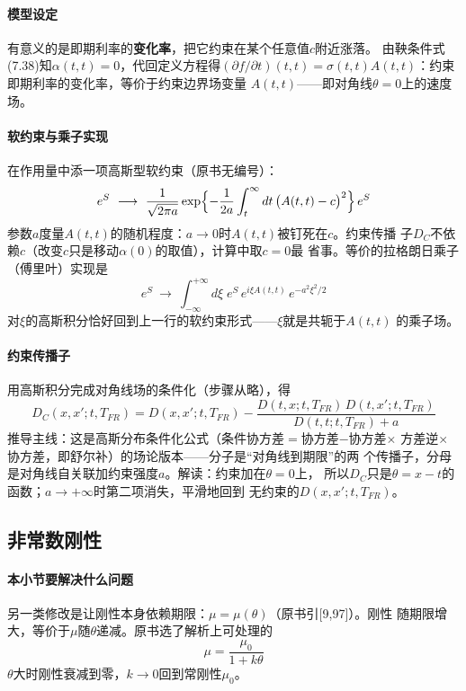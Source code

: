 \paragraph{模型设定}
有意义的是即期利率的\textbf{变化率}，把它约束在某个任意值$c$附近涨落。
由鞅条件式(7.38)知$\alpha(t,t)=0$，代回定义方程得$(\partial f/\partial t)
(t,t)=\sigma(t,t)A(t,t)$：约束即期利率的变化率，等价于约束边界场变量
$A(t,t)$——即对角线$\theta=0$上的速度场。

\paragraph{软约束与乘子实现}
在作用量中添一项高斯型软约束（原书无编号）：
\begin{equation*}
e^{S}\ \longrightarrow\ \frac{1}{\sqrt{2\pi a}}
\exp\Bigl\{-\frac{1}{2a}\int_{t}^{\infty}dt\,\bigl(A(t,t)-c\bigr)^{2}
\Bigr\}\,e^{S}
\end{equation*}
参数$a$度量$A(t,t)$的随机程度：$a\to0$时$A(t,t)$被钉死在$c$。约束传播
子$D_{C}$不依赖$c$（改变$c$只是移动$\alpha(0)$的取值），计算中取$c=0$最
省事。等价的拉格朗日乘子（傅里叶）实现是
\begin{equation*}
e^{S}\ \longrightarrow\ \int_{-\infty}^{+\infty}d\xi\;
e^{S}\,e^{i\xi A(t,t)}\,e^{-a^{2}\xi^{2}/2}
\tag{7.67}
\end{equation*}
对$\xi$的高斯积分恰好回到上一行的软约束形式——$\xi$就是共轭于$A(t,t)$
的乘子场。

\paragraph{约束传播子}
用高斯积分完成对角线场的条件化（步骤从略），得
\begin{equation*}
D_{C}(x,x';t,T_{FR})=D(x,x';t,T_{FR})-
\frac{D(t,x;t,T_{FR})\,D(t,x';t,T_{FR})}{D(t,t;t,T_{FR})+a}
\tag{7.68}
\end{equation*}
推导主线：这是高斯分布条件化公式（条件协方差$=$协方差$-$协方差$\times$
方差逆$\times$协方差，即舒尔补）的场论版本——分子是“对角线到期限”的两
个传播子，分母是对角线自关联加约束强度$a$。解读：约束加在$\theta=0$上，
所以$D_{C}$只是$\theta=x-t$的函数；$a\to+\infty$时第二项消失，平滑地回到
无约束的$D(x,x';t,T_{FR})$。

\subsection{非常数刚性}

\paragraph{本小节要解决什么问题}
另一类修改是让刚性本身依赖期限：$\mu=\mu(\theta)$（原书引[9,97]）。刚性
随期限增大，等价于$\mu$随$\theta$递减。原书选了解析上可处理的
\begin{equation*}
\mu=\frac{\mu_{0}}{1+k\theta}
\end{equation*}
$\theta$大时刚性衰减到零，$k\to0$回到常刚性$\mu_{0}$。

